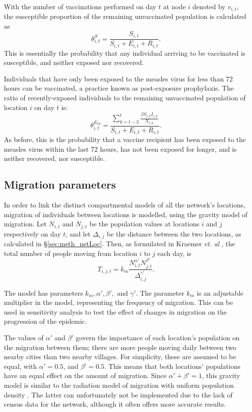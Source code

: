With the number of vaccinations performed on day $t$ at node $i$ denoted by $v_{i,t}$, the susceptible proportion of the remaining unvaccinated population is calculated as
$$\theta^{S}_{i,t} = \frac{S_{i,t}}{S_{i,t}+E_{i,t}+R_{i,t}}.$$ 
This is essentially the probability that any individual arriving to be vaccinated is susceptible, and neither exposed nor recovered.

Individuals that have only been exposed to the measles virus for less than 72 hours can be vaccinated, a practice known as post-exposure prophylaxis. The ratio of recently-exposed individuals to the remaining unvaccinated population of location $i$ on day $t$ is: $$\theta^{E_{72}}_{i,t} = \frac{\sum^{t}_{k=t-3} \frac{\beta S_{i,k}I_{i,k}}{N_{i,k}}}{S_{i,t}+E_{i,t}+R_{i,t}}.$$ 
As before, this is the probability that a vaccine recipient has been exposed to the measles virus within the last 72 hours, has not been exposed for longer, and is neither recovered, nor susceptible.

\subsection{Migration parameters} %
\label{sec:meth_migration}
In order to link the distinct compartmental models of all the network's locations, migration of individuals between locations is modelled, using the gravity model of migration. Let $N_{i,t}$ and $N_{j,t}$ be the population values at locations $i$ and $j$ respectively on day $t$, and let $\Delta_{i,j}$ be the distance between the two locations, as calculated in \S \ref{sec:meth_netLoc}. Then, as formulated in Kraemer \textit{et. al} \cite{kraemer2019utilizing}, the total number of people moving from location $i$ to $j$ each day, is
$$T_{i,j,t} = k_{m} \frac{N_{i,t}^{\alpha'} N_{j,t}^{\beta'}}{\Delta_{i,j}^{\gamma'}}.$$ 

The model has parameters $k_{m}, \alpha', \beta',$ and $\gamma'$. The parameter $k_{m}$ is an adjustable multiplier in the model, representing the frequency of migration. This can be used in sensitivity analysis to test the effect of changes in migration on the progression of the epidemic. 

The values of $\alpha'$ and $\beta'$ govern the importance of each location's population on the migration between them; there are more people moving daily between two nearby cities than two nearby villages. For simplicity, these are assumed to be equal, with $\alpha' = 0.5$, and $\beta' = 0.5$. This means that both locations' populations have an equal effect on the amount of migration. Since $\alpha' + \beta' = 1$, this gravity model is similar to the radiation model of migration with uniform population density \cite{simini2012universal}. The latter can unfortunately not be implemented due to the lack of census data for the network, although it often offers more accurate results. 

